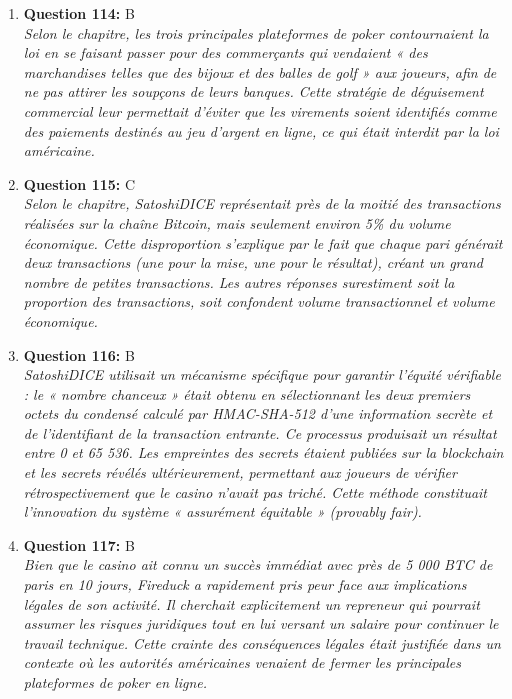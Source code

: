 \documentclass[12pt,a4paper]{article}
\begin{document}
\begin{enumerate}
\item \textbf{Question 114:} B
\\ \textit{Selon le chapitre, les trois principales plateformes de poker contournaient la loi en se faisant passer pour des commerçants qui vendaient « des marchandises telles que des bijoux et des balles de golf » aux joueurs, afin de ne pas attirer les soupçons de leurs banques. Cette stratégie de déguisement commercial leur permettait d'éviter que les virements soient identifiés comme des paiements destinés au jeu d'argent en ligne, ce qui était interdit par la loi américaine.}

\item \textbf{Question 115:} C
\\ \textit{Selon le chapitre, SatoshiDICE représentait près de la moitié des transactions réalisées sur la chaîne Bitcoin, mais seulement environ 5\% du volume économique. Cette disproportion s'explique par le fait que chaque pari générait deux transactions (une pour la mise, une pour le résultat), créant un grand nombre de petites transactions. Les autres réponses surestiment soit la proportion des transactions, soit confondent volume transactionnel et volume économique.}

\item \textbf{Question 116:} B
\\ \textit{SatoshiDICE utilisait un mécanisme spécifique pour garantir l'équité vérifiable : le « nombre chanceux » était obtenu en sélectionnant les deux premiers octets du condensé calculé par HMAC-SHA-512 d'une information secrète et de l'identifiant de la transaction entrante. Ce processus produisait un résultat entre 0 et 65 536. Les empreintes des secrets étaient publiées sur la blockchain et les secrets révélés ultérieurement, permettant aux joueurs de vérifier rétrospectivement que le casino n'avait pas triché. Cette méthode constituait l'innovation du système « assurément équitable » (provably fair).}

\item \textbf{Question 117:} B
\\ \textit{Bien que le casino ait connu un succès immédiat avec près de 5 000 BTC de paris en 10 jours, Fireduck a rapidement pris peur face aux implications légales de son activité. Il cherchait explicitement un repreneur qui pourrait assumer les risques juridiques tout en lui versant un salaire pour continuer le travail technique. Cette crainte des conséquences légales était justifiée dans un contexte où les autorités américaines venaient de fermer les principales plateformes de poker en ligne.}


\end{enumerate}
\end{document}
